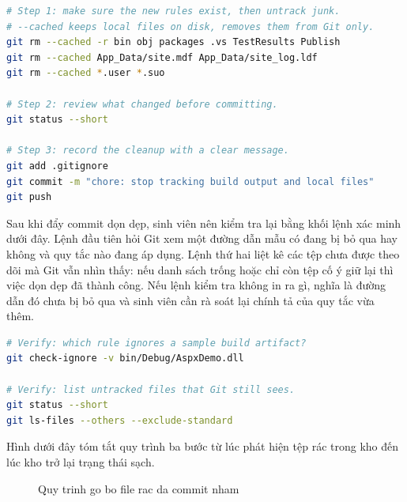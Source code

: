 \begin{lstlisting}[language=bash]
# Step 1: make sure the new rules exist, then untrack junk.
# --cached keeps local files on disk, removes them from Git only.
git rm --cached -r bin obj packages .vs TestResults Publish
git rm --cached App_Data/site.mdf App_Data/site_log.ldf
git rm --cached *.user *.suo

# Step 2: review what changed before committing.
git status --short

# Step 3: record the cleanup with a clear message.
git add .gitignore
git commit -m "chore: stop tracking build output and local files"
git push
\end{lstlisting}

Sau khi đẩy commit dọn dẹp, sinh viên nên kiểm tra lại bằng khối lệnh xác minh dưới đây.
Lệnh đầu tiên hỏi Git xem một đường dẫn mẫu có đang bị bỏ qua hay không và quy tắc nào đang áp dụng.
Lệnh thứ hai liệt kê các tệp chưa được theo dõi mà Git vẫn nhìn thấy: nếu danh sách trống hoặc chỉ còn tệp cố ý giữ lại thì việc dọn dẹp đã thành công.
Nếu lệnh kiểm tra không in ra gì, nghĩa là đường dẫn đó chưa bị bỏ qua và sinh viên cần rà soát lại chính tả của quy tắc vừa thêm.

\begin{lstlisting}[language=bash]
# Verify: which rule ignores a sample build artifact?
git check-ignore -v bin/Debug/AspxDemo.dll

# Verify: list untracked files that Git still sees.
git status --short
git ls-files --others --exclude-standard
\end{lstlisting}

Hình dưới đây tóm tắt quy trình ba bước từ lúc phát hiện tệp rác trong kho đến lúc kho trở lại trạng thái sạch.

\begin{figure}[H]
\centering
{}
\caption{Quy trinh go bo file rac da commit nham}
\label{fig:pb-uncommit-flow}
\end{figure}

